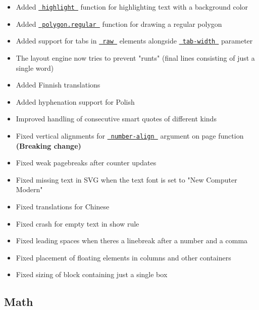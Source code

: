 \begin{itemize}
\tightlist
\item
  Added \href{/docs/reference/text/highlight/}{\texttt{\ highlight\ }}
  function for highlighting text with a background color
\item
  Added
  \href{/docs/reference/visualize/polygon/\#definitions-regular}{\texttt{\ polygon.regular\ }}
  function for drawing a regular polygon
\item
  Added support for tabs in
  \href{/docs/reference/text/raw/}{\texttt{\ raw\ }} elements alongside
  \href{/docs/reference/text/raw/\#parameters-tab-size}{\texttt{\ tab-width\ }}
  parameter
\item
  The layout engine now tries to prevent "runts" (final lines consisting
  of just a single word)
\item
  Added Finnish translations
\item
  Added hyphenation support for Polish
\item
  Improved handling of consecutive smart quotes of different kinds
\item
  Fixed vertical alignments for
  \href{/docs/reference/layout/page/\#parameters-number-align}{\texttt{\ number-align\ }}
  argument on page function \textbf{(Breaking change)}
\item
  Fixed weak pagebreaks after counter updates
\item
  Fixed missing text in SVG when the text font is set to "New Computer
  Modern"
\item
  Fixed translations for Chinese
\item
  Fixed crash for empty text in show rule
\item
  Fixed leading spaces when there\textquotesingle s a linebreak after a
  number and a comma
\item
  Fixed placement of floating elements in columns and other containers
\item
  Fixed sizing of block containing just a single box
\end{itemize}

\subsection{Math}\label{math}

